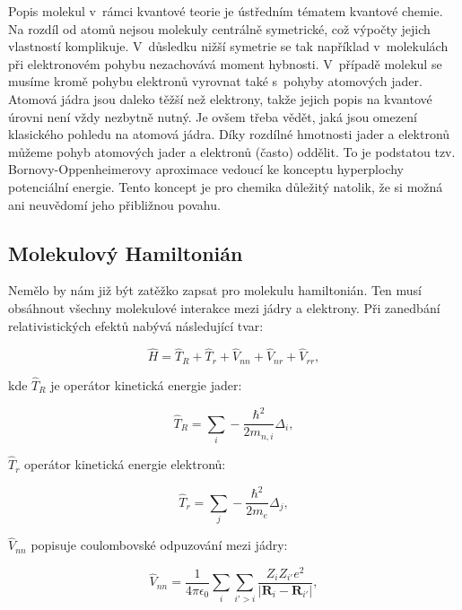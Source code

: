 Popis molekul v~rámci kvantové teorie je ústředním tématem kvantové chemie. Na rozdíl od atomů nejsou molekuly centrálně symetrické, což výpočty jejich vlastností komplikuje. V~důsledku nižší symetrie se tak například v~molekulách při elektronovém pohybu nezachovává moment hybnosti. V~případě molekul se musíme kromě pohybu elektronů vyrovnat také s~pohyby atomových jader. Atomová jádra jsou daleko těžší než elektrony, takže jejich popis na kvantové úrovni není vždy nezbytně nutný. Je ovšem třeba vědět, jaká jsou omezení klasického pohledu na atomová jádra. Díky rozdílné hmotnosti jader a elektronů můžeme pohyb atomových jader a elektronů (často) oddělit. To je podstatou tzv. Bornovy-Oppenheimerovy aproximace vedoucí ke konceptu hyperplochy potenciální energie. Tento koncept je pro chemika důležitý natolik, že si možná ani neuvědomí jeho přibližnou povahu.  


\subsection{Molekulový Hamiltonián}


Nemělo by nám již být zatěžko zapsat pro molekulu hamiltonián. Ten musí obsáhnout všechny molekulové interakce mezi jádry a elektrony. Při zanedbání relativistických efektů nabývá následující tvar:

\begin{equation}
\hat{H}=\hat{T}_R+\hat{T}_r+\hat{V}_{nn}+\hat{V}_{nr}+\hat{V}_{rr}, 
\label{rov:mol-Hamiltonian}
\end{equation}

\noindent kde $\hat{T}_R$ je operátor kinetická energie jader:

\begin{equation}
\hat{T}_R=\sum_i	-\frac{\hbar^2}{2m_{n,i}}\Delta_{i}, 	
\end{equation}

\noindent $\hat{T}_r$ operátor kinetická energie elektronů:

\begin{equation}
\hat{T}_r=\sum_j	-\frac{\hbar^2}{2m_{e}}\Delta_{j}, 	
\end{equation}

\noindent $\hat{V}_{nn}$ popisuje coulombovské odpuzování mezi jádry:

\begin{equation}
\hat{V}_{nn}=\frac{1}{4\pi\epsilon_0}\sum_i\sum_{i'>i}\frac{Z_iZ_{i'} e^2}{ \left\vert \textbf{R}_i - \textbf{R}_{i'}\right\vert } , 	
\end{equation}

